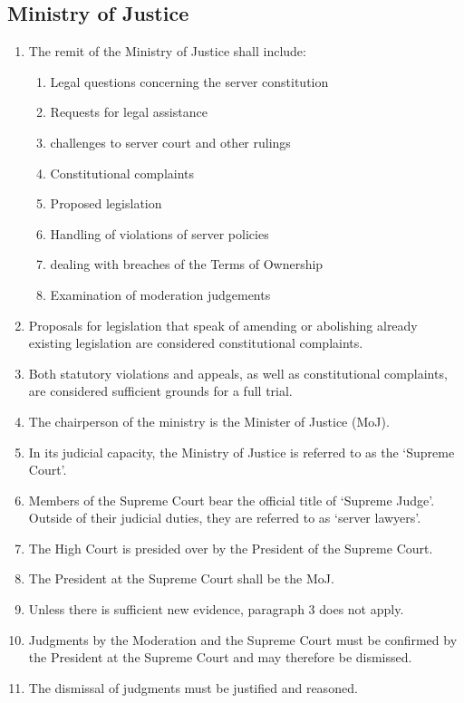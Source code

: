 \documentclass{article}
\begin{document}
\subsection{Ministry of Justice}
\begin{enumerate}[(1)]
	\item The remit of the Ministry of Justice shall include:
	\begin{enumerate}[(1)]
		\item Legal questions concerning the server constitution
		\item Requests for legal assistance
		\item challenges to server court and other rulings
		\item Constitutional complaints
		\item Proposed legislation
		\item Handling of violations of server policies
		\item dealing with breaches of the Terms of Ownership
		\item Examination of moderation judgements
	\end{enumerate}
    \item Proposals for legislation that speak of amending or abolishing already existing legislation are considered constitutional complaints.
	\item Both statutory violations and appeals, as well as constitutional complaints, are considered sufficient grounds for a full trial.
	\item The chairperson of the ministry is the Minister of Justice (MoJ).
	\item In its judicial capacity, the Ministry of Justice is referred to as the `Supreme Court'.
	\item Members of the Supreme Court bear the official title of `Supreme Judge'. Outside of their judicial duties, they are referred to as `server lawyers'.
	\item The High Court is presided over by the President of the Supreme Court.
    \item The President at the Supreme Court shall be the MoJ.\@
	\item Unless there is sufficient new evidence, paragraph 3 does not apply.
	\item Judgments by the Moderation and the Supreme Court must be confirmed by the President at the Supreme Court and may therefore be dismissed.
	\item The dismissal of judgments must be justified and reasoned.
\end{enumerate}
\end{document}
